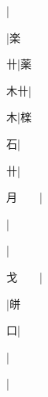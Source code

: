 \begin{multicols}{2}
{{\cjk{}{\cnsym{}　}{\cnsym{}　}{\cnsym{}　}}|{}\par
{\cjk{}{\cnsym{}　}{\cnsym{}　}{\cnsym{}　}}|{\cjk{}楽}\par
{\cjk{}{\cnsym{}　}{\cnsym{}　}卄}|{\cjk{}薬}\par
{\cjk{}{\cnsym{}　}木卄}|{}\par
{\cjk{}{\cnsym{}　}{\cnsym{}　}木}|{\cjk{}檪}\par
{\cjk{}{\cnsym{}　}{\cnsym{}　}石}|{}\par
{\cjk{}{\cnsym{}　}{\cnsym{}　}卄}|{}\par
{\cjk{}月{\cnsym{}　}{\cnsym{}　}}|{}\par
{\cjk{}{\cnsym{}　}{\cnsym{}　}{\cnsym{}　}}|{}\par
{\cjk{}{\cnsym{}　}{\cnsym{}　}{\cnsym{}　}}|{}\par
{\cjk{}戈{\cnsym{}　}{\cnsym{}　}}|{}\par
{\cjk{}{\cnsym{}　}{\cnsym{}　}{\cnsym{}　}}|{\cjk{}皏}\par
{\cjk{}{\cnsym{}　}{\cnsym{}　}口}|{}\par
{\cjk{}{\cnsym{}　}{\cnsym{}　}{\cnsym{}　}}|{}\par
{\cjk{}{\cnsym{}　}{\cnsym{}　}{\cnsym{}　}}|{}\par
}
\end{multicols}
